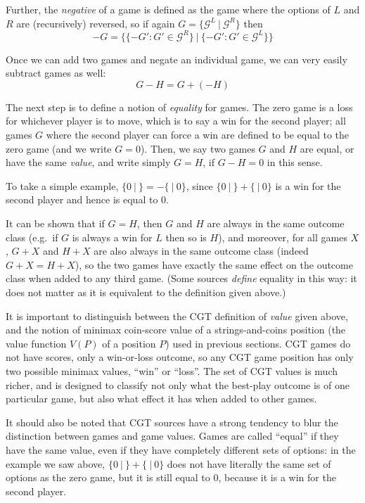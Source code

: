 \documentclass[a4paper,twocolumn]{article}
\newcommand{\cgtgame}[2]{\{#1 \:|\: #2\}}
\begin{document}
Further, the \emph{negative} of a game is defined as the game where
the options of $L$ and $R$ are (recursively) reversed, so if again $G
= \cgtgame{\mathcal{G}^L}{\mathcal{G}^R}$ then $$-G = \cgtgame{\{-G' :
  G' \in \mathcal{G}^R\}}{\{-G' : G' \in \mathcal{G}^L\}}$$

Once we can add two games and negate an individual game, we can very
easily subtract games as well: $$G - H = G + (-H)$$

The next step is to define a notion of \emph{equality} for games. The
zero game is a loss for whichever player is to move, which is to say a
win for the second player; all games $G$ where the second player can
force a win are defined to be equal to the zero game (and we write $G
= 0$). Then, we say two games $G$ and $H$ are equal, or have the same
\emph{value}, and write simply $G = H$, if $G - H = 0$ in this sense.

To take a simple example, $\cgtgame{0}{} = -\cgtgame{}{0}$, since
$\cgtgame{0}{} + \cgtgame{}{0}$ is a win for the second player and
hence is equal to $0$.

It can be shown that if $G = H$, then $G$ and $H$ are always in the
same outcome class (e.g.\ if $G$ is always a win for $L$ then so is
$H$), and moreover, for all games $X$, $G+X$ and $H+X$ are also always
in the same outcome class (indeed $G+X = H+X$), so the two games have
exactly the same effect on the outcome class when added to any third
game. (Some sources \emph{define} equality in this way: it does not
matter as it is equivalent to the definition given above.)

It is important to distinguish between the CGT definition of
\emph{value} given above, and the notion of minimax coin-score value
of a strings-and-coins position (the value function $V(P)$ of a
position $P$) used in previous sections. CGT games do not have scores,
only a win-or-loss outcome, so any CGT game position has only two
possible minimax values, ``win'' or ``loss''. The set of CGT values is
much richer, and is designed to classify not only what the best-play
outcome is of one particular game, but also what effect it has when
added to other games.

It should also be noted that CGT sources have a strong tendency to
blur the distinction between games and game values. Games are called
``equal'' if they have the same value, even if they have completely
different sets of options: in the example we saw above, $\cgtgame{0}{}
+ \cgtgame{}{0}$ does not have literally the same set of options as
the zero game, but it is still equal to $0$, because it is a win for
the second player.
\end{document}
